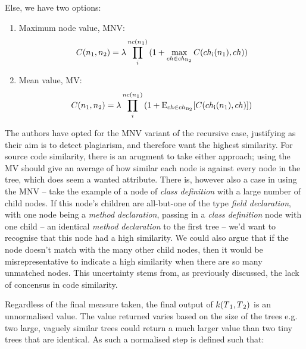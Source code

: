 Else, we have two options:

\begin{enumerate}
\item Maximum node value, MNV:
\begin{equation}\label{eq:parseTreeKernelRecurse}
C(n\textsubscript{1}, n\textsubscript{2}) = \lambda\prod_{i}^{nc(n\textsubscript{1})}
{(1+\max_{ch \in ch \textsubscript{n\textsubscript{2}}}{C(ch\textsubscript{i}
(n\textsubscript{1}), ch))}}
\end{equation}

\item Mean value, MV:
\begin{equation}
C(n\textsubscript{1}, n\textsubscript{2}) = \lambda\prod_{i}^{nc(n\textsubscript{1})}
{(1+\mathrm{E}_{ch \in ch \textsubscript{n\textsubscript{2}}}{[C(ch\textsubscript{i}
(n\textsubscript{1}), ch)])}}
\end{equation}
\end{enumerate}
\label{secondImprovementParseTreeKernel}

The authors have opted for the MNV variant of the recursive case, justifying
as their aim is to detect plagiarism, and therefore want the highest similarity.
For source code similarity, there is an arugment to take either approach; 
using the MV should give an average of how similar each node is
against every node in the tree, which does seem a wanted attribute. There is,
however also a case in using the MNV -- take the example of a node
of \emph{class definition} with a large number of child nodes. If this
node's children are all-but-one of the type \emph{field declaration}, with one
node being a \emph{method declaration}, passing in a \emph{class definition} node
with one child -- an identical \emph{method declaration} to the first tree -- we'd
want to recognise that this node had a high similarity. We could also argue that
if the node doesn't match with the many other child nodes, then it would be
misrepresentative to indicate a high similarity when there are so many unmatched
nodes. This uncertainty stems from, as previously discussed, the lack of concensus
in code similarity.

Regardless of the final measure taken, the final output of $k(T\textsubscript{1},
T\textsubscript{2})$ is an unnormalised value. The value returned varies 
based on the size of the trees e.g. two large, vaguely similar trees 
could return a much larger value than two tiny trees that are identical. As
such a normalised step is defined such that:

